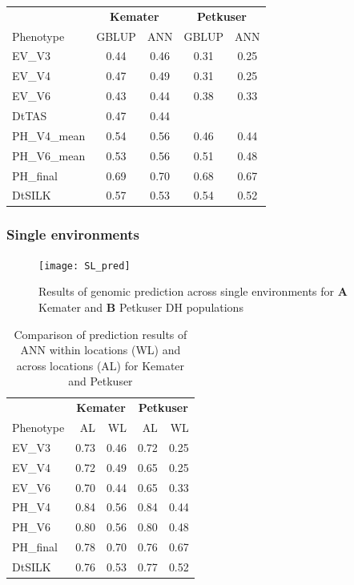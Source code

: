 \onehalfspacing
\begin{table}[H]
\centering
\begin{tabular}{lcc|cc}
  \toprule
  & \multicolumn{2}{c}{\textbf{Kemater}}  & \multicolumn{2}{c}{\textbf{Petkuser}} \\
  Phenotype & GBLUP & ANN & GBLUP & ANN \\ 
  \midrule
  EV\_V3 & 0.44 & 0.46 & 0.31 & 0.25 \\ 
  EV\_V4 & 0.47 & 0.49 & 0.31 & 0.25 \\ 
  EV\_V6 & 0.43 & 0.44 & 0.38 & 0.33 \\ 
  DtTAS & 0.47 & 0.44 &  &  \\ 
  PH\_V4\_mean & 0.54 & 0.56 & 0.46 & 0.44 \\ 
  PH\_V6\_mean & 0.53 & 0.56 & 0.51 & 0.48 \\ 
  PH\_final & 0.69 & 0.70 & 0.68 & 0.67 \\ 
  DtSILK & 0.57 & 0.53 & 0.54 & 0.52 \\ 
  \bottomrule
\end{tabular}
\end{table}
\doublespacing

\subsubsection{Single environments}

\begin{figure}[H]
  \centering \texttt{[image: SL\_pred]}
  \decoRule
  \caption[Results of genomic prediction across single environments for Kemater and Petkuser DH populations]{Results of genomic prediction across single environments for \textbf{A} Kemater  and \textbf{B} Petkuser DH populations}
\label{fig:sl_pred}
\end{figure}

\onehalfspacing
\begin{table}[H]
  \centering
  \caption[Comparison of prediction results of ANN within locations and across locations for Kemater and Petkuser]{Comparison of prediction results of ANN within locations (WL)  and across locations (AL) for Kemater and Petkuser}
  \begin{tabular}{lrr|rr}
    \toprule
    & \multicolumn{2}{c}{\textbf{Kemater}}  & \multicolumn{2}{c}{\textbf{Petkuser}} \\
    Phenotype & AL   & WL   & AL    & WL \\ 
    \midrule
    EV\_V3    & 0.73 & 0.46 & 0.72 & 0.25 \\ 
    EV\_V4    & 0.72 & 0.49 & 0.65 & 0.25 \\ 
    EV\_V6    & 0.70 & 0.44 & 0.65 & 0.33 \\ 
    PH\_V4    & 0.84 & 0.56 & 0.84 & 0.44 \\ 
    PH\_V6    & 0.80 & 0.56 & 0.80 & 0.48 \\ 
    PH\_final & 0.78 & 0.70 & 0.76 & 0.67 \\ 
    DtSILK    & 0.76 & 0.53 & 0.77 & 0.52 \\ 
    \bottomrule
  \end{tabular}
\end{table}
\doublespacing

